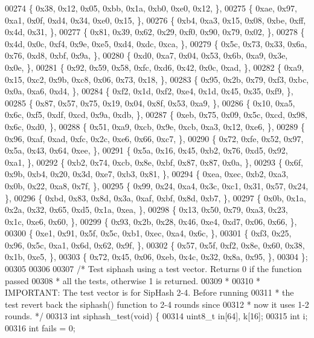 \begin{DoxyCode}
{00274     \{ 0x38, 0x12, 0x05, 0xbb, 0x1a, 0xb0, 0xe0, 0x12, \},
00275     \{ 0xae, 0x97, 0xa1, 0x0f, 0xd4, 0x34, 0xe0, 0x15, \},
00276     \{ 0xb4, 0xa3, 0x15, 0x08, 0xbe, 0xff, 0x4d, 0x31, \},
00277     \{ 0x81, 0x39, 0x62, 0x29, 0xf0, 0x90, 0x79, 0x02, \},
00278     \{ 0x4d, 0x0c, 0xf4, 0x9e, 0xe5, 0xd4, 0xdc, 0xca, \},
00279     \{ 0x5c, 0x73, 0x33, 0x6a, 0x76, 0xd8, 0xbf, 0x9a, \},
00280     \{ 0xd0, 0xa7, 0x04, 0x53, 0x6b, 0xa9, 0x3e, 0x0e, \},
00281     \{ 0x92, 0x59, 0x58, 0xfc, 0xd6, 0x42, 0x0c, 0xad, \},
00282     \{ 0xa9, 0x15, 0xc2, 0x9b, 0xc8, 0x06, 0x73, 0x18, \},
00283     \{ 0x95, 0x2b, 0x79, 0xf3, 0xbc, 0x0a, 0xa6, 0xd4, \},
00284     \{ 0xf2, 0x1d, 0xf2, 0xe4, 0x1d, 0x45, 0x35, 0xf9, \},
00285     \{ 0x87, 0x57, 0x75, 0x19, 0x04, 0x8f, 0x53, 0xa9, \},
00286     \{ 0x10, 0xa5, 0x6c, 0xf5, 0xdf, 0xcd, 0x9a, 0xdb, \},
00287     \{ 0xeb, 0x75, 0x09, 0x5c, 0xcd, 0x98, 0x6c, 0xd0, \},
00288     \{ 0x51, 0xa9, 0xcb, 0x9e, 0xcb, 0xa3, 0x12, 0xe6, \},
00289     \{ 0x96, 0xaf, 0xad, 0xfc, 0x2c, 0xe6, 0x66, 0xc7, \},
00290     \{ 0x72, 0xfe, 0x52, 0x97, 0x5a, 0x43, 0x64, 0xee, \},
00291     \{ 0x5a, 0x16, 0x45, 0xb2, 0x76, 0xd5, 0x92, 0xa1, \},
00292     \{ 0xb2, 0x74, 0xcb, 0x8e, 0xbf, 0x87, 0x87, 0x0a, \},
00293     \{ 0x6f, 0x9b, 0xb4, 0x20, 0x3d, 0xe7, 0xb3, 0x81, \},
00294     \{ 0xea, 0xec, 0xb2, 0xa3, 0x0b, 0x22, 0xa8, 0x7f, \},
00295     \{ 0x99, 0x24, 0xa4, 0x3c, 0xc1, 0x31, 0x57, 0x24, \},
00296     \{ 0xbd, 0x83, 0x8d, 0x3a, 0xaf, 0xbf, 0x8d, 0xb7, \},
00297     \{ 0x0b, 0x1a, 0x2a, 0x32, 0x65, 0xd5, 0x1a, 0xea, \},
00298     \{ 0x13, 0x50, 0x79, 0xa3, 0x23, 0x1c, 0xe6, 0x60, \},
00299     \{ 0x93, 0x2b, 0x28, 0x46, 0xe4, 0xd7, 0x06, 0x66, \},
00300     \{ 0xe1, 0x91, 0x5f, 0x5c, 0xb1, 0xec, 0xa4, 0x6c, \},
00301     \{ 0xf3, 0x25, 0x96, 0x5c, 0xa1, 0x6d, 0x62, 0x9f, \},
00302     \{ 0x57, 0x5f, 0xf2, 0x8e, 0x60, 0x38, 0x1b, 0xe5, \},
00303     \{ 0x72, 0x45, 0x06, 0xeb, 0x4c, 0x32, 0x8a, 0x95, \},
00304 \};
00305 
00306 
00307 \textcolor{comment}{/* Test siphash using a test vector. Returns 0 if the function passed}
00308 \textcolor{comment}{ * all the tests, otherwise 1 is returned.}
00309 \textcolor{comment}{ *}
00310 \textcolor{comment}{ * IMPORTANT: The test vector is for SipHash 2-4. Before running}
00311 \textcolor{comment}{ * the test revert back the siphash() function to 2-4 rounds since}
00312 \textcolor{comment}{ * now it uses 1-2 rounds. */}
00313 \textcolor{keywordtype}{int} siphash\_test(\textcolor{keywordtype}{void}) \{
00314     uint8\_t in[64], k[16];
00315     \textcolor{keywordtype}{int} i;
00316     \textcolor{keywordtype}{int} fails = 0;
}
\end{DoxyCode}
